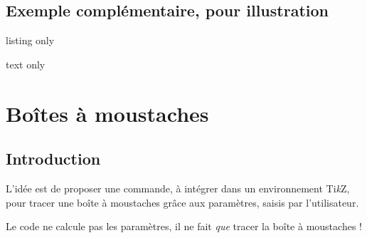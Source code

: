 \documentclass[a4paper,french,11pt]{article}
\providecommand\tikzlogo{Ti\textit{k}Z}
\let\TikZ\tikzlogo
\begin{document}
\subsection{Exemple complémentaire, pour illustration}

\begin{PresCodeTexPL}{listing only}
\def\LLX{1994,1995,1996,1997,1998,1999,2000,2001,2002,2004,2005,2006,2007,2008,2009,2010}
\def\LLY{1718,1710,1708,1700,1698,1697,1691,1688,1683,1679,1671,1670,1663,1661,1656,1649}


\end{PresCodeTexPL}

\begin{PresCodeSortiePL}{text only}
\def\LLX{1994,1995,1996,1997,1998,1999,2000,2001,2002,2004,2005,2006,2007,2008,2009,2010}
\def\LLY{1718,1710,1708,1700,1698,1697,1691,1688,1683,1679,1671,1670,1663,1661,1656,1649}

\end{PresCodeSortiePL}

\newpage

\section{Boîtes à moustaches}\label{boiteamoustaches}

\subsection{Introduction}

\begin{tipblock}
L'idée est de proposer une commande, à intégrer dans un environnement \TikZ, pour tracer une boîte à moustaches grâce aux paramètres, saisis par l'utilisateur.

\smallskip

Le code ne calcule pas les paramètres, il ne fait \textit{que} tracer la boîte à moustaches !
\end{tipblock}
\end{document}
